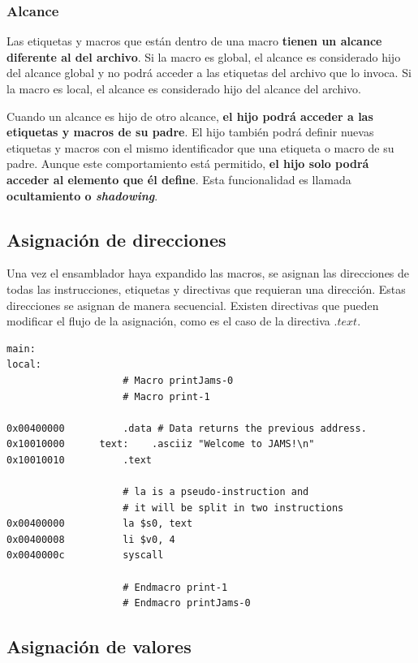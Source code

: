 \subsubsection{Alcance}\label{subsubsec:alcance}

Las etiquetas y macros que están dentro de una macro
\textbf{tienen un alcance diferente al del archivo}.
Si la macro es global, el alcance es considerado hijo del alcance global
y no podrá acceder a las etiquetas del archivo que lo invoca.
Si la macro es local, el alcance es considerado hijo del alcance del archivo.

Cuando un alcance es hijo de otro alcance,
\textbf{el hijo podrá acceder a las etiquetas y macros de su padre}.
El hijo también podrá definir nuevas etiquetas y macros con el mismo
identificador que una etiqueta o macro de su padre.
Aunque este comportamiento está permitido, \textbf{el hijo solo podrá acceder
al elemento que él define}.
Esta funcionalidad es llamada \textbf{ocultamiento o \textit{shadowing}}.

\subsection{Asignación de direcciones}\label{subsec:asignacion-de-direcciones}

Una vez el ensamblador haya expandido las macros,
se asignan las direcciones de todas las instrucciones,
etiquetas y directivas que requieran una dirección.
Estas direcciones se asignan de manera secuencial.
Existen directivas que pueden modificar el flujo de la asignación,
como es el caso de la directiva $.text$.

\begin{lstlisting}[frame=single,label={lst:address-assignation}]
main:
local:
                    # Macro printJams-0
                    # Macro print-1

0x00400000          .data # Data returns the previous address.
0x10010000      text:    .asciiz "Welcome to JAMS!\n"
0x10010010          .text

                    # la is a pseudo-instruction and
                    # it will be split in two instructions
0x00400000          la $s0, text
0x00400008          li $v0, 4
0x0040000c          syscall

                    # Endmacro print-1
                    # Endmacro printJams-0
\end{lstlisting}

\subsection{Asignación de valores}\label{subsec:asignacion-de-valores}

